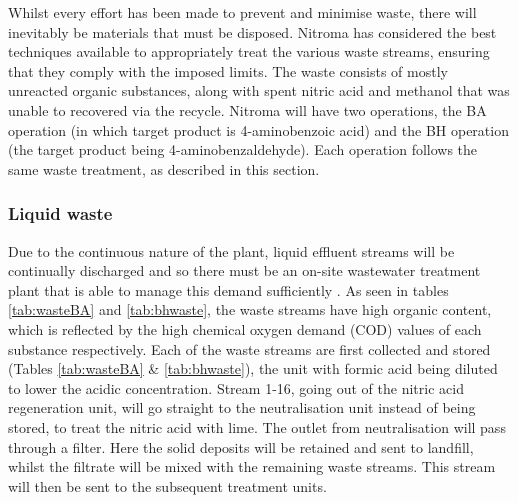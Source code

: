 Whilst every effort has been made to prevent and minimise waste, there will inevitably be materials that must be disposed. Nitroma has considered the best techniques available to appropriately treat the various waste streams, ensuring that they comply with the imposed limits. The waste consists of mostly unreacted organic substances, along with spent nitric acid and methanol that was unable to recovered via the recycle. Nitroma will have two operations, the BA operation (in which target product is 4-aminobenzoic acid) and the BH operation (the target product being 4-aminobenzaldehyde). Each operation follows the same waste treatment, as described in this section. 

\subsubsection{Liquid waste }

Due to the continuous nature of the plant, liquid effluent streams will be continually discharged and so there must be an on-site wastewater treatment plant that is able to manage this demand sufficiently \cite{water_innovations_inc_continuous_2021}.  As seen in tables \ref{tab:wasteBA} and \ref{tab:bhwaste}, the waste streams have high organic content, which is reflected by the high chemical oxygen demand (COD) values of each substance respectively. Each of the waste streams are first collected and stored (Tables \ref{tab:wasteBA} \& \ref{tab:bhwaste}), the unit with formic acid being diluted to lower the acidic concentration. Stream 1-16, going out of the nitric acid regeneration unit, will go straight to the neutralisation unit instead of being stored, to treat the nitric acid with lime. The outlet from neutralisation will pass through a filter. Here the solid deposits will be retained and sent to landfill, whilst the filtrate will be mixed with the remaining waste streams. This stream will then be sent to the subsequent treatment units. 

